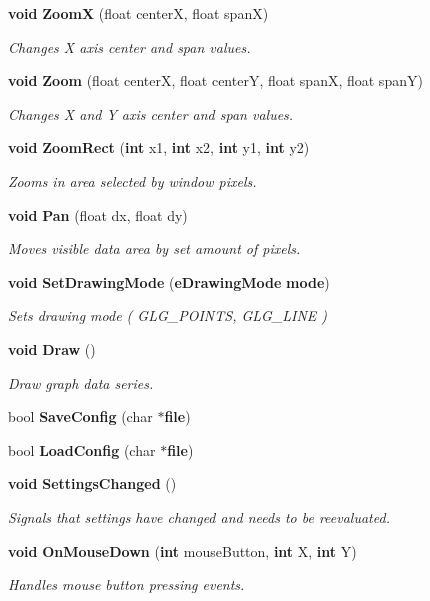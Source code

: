 \begin{DoxyCompactItemize}
{\bf void} {\bf ZoomX} (float centerX, float spanX)
\begin{DoxyCompactList}\small\item\em Changes X axis center and span values. \end{DoxyCompactList}\item 
{\bf void} {\bf Zoom} (float centerX, float centerY, float spanX, float spanY)
\begin{DoxyCompactList}\small\item\em Changes X and Y axis center and span values. \end{DoxyCompactList}\item 
{\bf void} {\bf Zoom\+Rect} ({\bf int} x1, {\bf int} x2, {\bf int} y1, {\bf int} y2)
\begin{DoxyCompactList}\small\item\em Zooms in area selected by window pixels. \end{DoxyCompactList}\item 
{\bf void} {\bf Pan} (float dx, float dy)
\begin{DoxyCompactList}\small\item\em Moves visible data area by set amount of pixels. \end{DoxyCompactList}\item 
{\bf void} {\bf Set\+Drawing\+Mode} ({\bf e\+Drawing\+Mode} {\bf mode})
\begin{DoxyCompactList}\small\item\em Sets drawing mode ( G\+L\+G\+\_\+\+P\+O\+I\+N\+TS, G\+L\+G\+\_\+\+L\+I\+NE ) \end{DoxyCompactList}\item 
{\bf void} {\bf Draw} ()
\begin{DoxyCompactList}\small\item\em Draw graph data series. \end{DoxyCompactList}\item 
bool {\bf Save\+Config} (char $\ast${\bf file})
\item 
bool {\bf Load\+Config} (char $\ast${\bf file})
\item 
{\bf void} {\bf Settings\+Changed} ()
\begin{DoxyCompactList}\small\item\em Signals that settings have changed and needs to be reevaluated. \end{DoxyCompactList}\item 
{\bf void} {\bf On\+Mouse\+Down} ({\bf int} mouse\+Button, {\bf int} X, {\bf int} Y)
\begin{DoxyCompactList}\small\item\em Handles mouse button pressing events. \end{DoxyCompactList}\item 

\end{DoxyCompactItemize}
